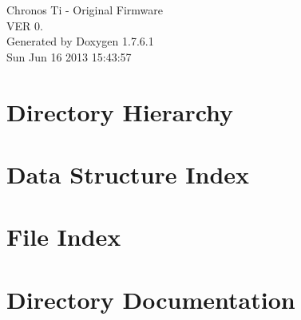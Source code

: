 \documentclass[a4paper]{book}
\begin{document}
\hypersetup{pageanchor=false,citecolor=blue}
\begin{titlepage}
\vspace*{7cm}
\begin{center}
{\Large \-Chronos \-Ti -\/ \-Original \-Firmware \\[1ex]\large \-V\-E\-R 0. }\\
\vspace*{1cm}
{\large \-Generated by Doxygen 1.7.6.1}\\
\vspace*{0.5cm}
{\small Sun Jun 16 2013 15:43:57}\\
\end{center}
\end{titlepage}
\clearemptydoublepage
{}
\tableofcontents
\clearemptydoublepage
{}
\hypersetup{pageanchor=true,citecolor=blue}
\chapter{\-Directory \-Hierarchy}

\chapter{\-Data \-Structure \-Index}

\chapter{\-File \-Index}

\chapter{\-Directory \-Documentation}
























\end{document}

